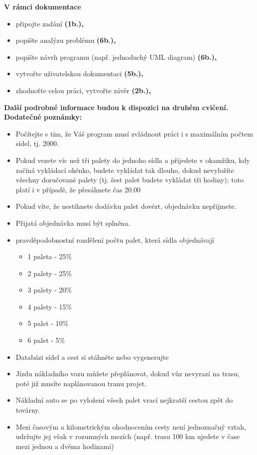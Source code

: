 \documentclass[ 12pt, a4paper]{article}
\begin{document}
\textbf{V rámci dokumentace}
\begin{itemize}
  \item připojte zadání \textbf{(1b.),}
  \item popište analýzu problému \textbf{(6b.),}
  \item popište návrh programu (např. jednoduchý UML diagram) \textbf{(6b.),}
  \item vytvořte uživatelskou dokumentaci \textbf{(5b.),}
  \item zhodnoťte celou práci, vytvořte závěr \textbf{(2b.),}
\end{itemize}
\textbf{Další podrobné informace budou k dispozici na druhém cvičení.}\newline
\textbf{Dodatečné poznámky:}
\begin{itemize}
  \item Počítejte s tím, že Váš program musí zvládnout práci i s maximálním počtem sídel, tj. 2000.
  \item Pokud vezete víc než tři palety do jednoho sídla a přijedete v okamžiku, kdy začíná vykládací okénko, budete vykládat tak dlouho, dokud nevyložíte všechny doručované palety (tj. šest palet budete vykládat tři hodiny); toto platí i v případě, že přesáhnete čas 20.00
  \item Pokud víte, že nestihnete dodávku palet dovézt, objednávku nepřijmete.
  \item Přijatá objednávka musí být splněna.
  \item pravděpodobnostní rozdělení počtu palet, která sídla objednávají
  \begin{itemize}
    \item 1 paleta - 25\%
    \item 2 palety - 25\%
    \item 3 palety - 20\%
    \item 4 palety - 15\%
    \item 5 palet - 10\%
    \item 6 palet - 5\%
  \end{itemize}
  \item Databázi sídel a cest si stáhněte nebo vygenerujte
  \item Jízdu nákladního vozu můžete přeplánovat, dokud vůz nevyrazí na trasu, poté již musíte naplánovanou tranu projet.
  \item Nákladní auto se po vyložení všech palet vrací nejkratší cestou zpět do továrny.
  \item Mezi časovým a kilometrickým ohodnocením cesty není jednoznačný vztah, udržujte jej však v rozumných mezích (např. trasu 100 km ujedete v čase mezi jednou a dvěma hodinami)
\end{itemize}
%
%
%
\end{document}

